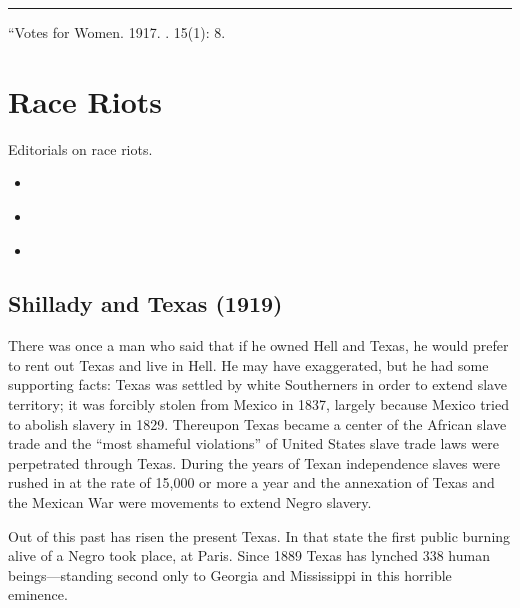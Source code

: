 \documentclass[letterpaper,10pt,english]{jupyterBook}
\begin{document}
\bigskip\hrule\bigskip


\sphinxAtStartPar
{} “Votes for Women. 1917. . 15(1): 8.


\chapter{Race Riots}
\label{\detokenize{Sections/race_riots:race-riots}}\label{\detokenize{Sections/race_riots::doc}}
\sphinxAtStartPar
Editorials on race riots.
\begin{itemize}
\item {} 
\sphinxAtStartPar
{\hyperref[\detokenize{Volumes/18/06/shillady_and_texas::doc}]{}}

\item {} 
\sphinxAtStartPar
{\hyperref[\detokenize{Volumes/34/06/mob_tactics::doc}]{}}

\item {} 
\sphinxAtStartPar
{\hyperref[\detokenize{Volumes/19/03/brothers_come_north::doc}]{}}

\end{itemize}


\section{Shillady and Texas (1919)}
\label{\detokenize{Volumes/18/06/shillady_and_texas:shillady-and-texas-1919}}\label{\detokenize{Volumes/18/06/shillady_and_texas::doc}}
\sphinxAtStartPar
There was once a man who said that if he owned Hell and Texas, he would prefer to rent out Texas and live in Hell. He may have exaggerated, but he had some supporting facts: Texas was settled by white Southerners in order to extend slave territory; it was forcibly stolen from Mexico in 1837, largely because Mexico tried to abolish slavery in 1829. Thereupon Texas became a center of the African slave trade and the “most shameful violations” of United States slave trade laws were perpetrated through Texas. During the years of Texan independence slaves were rushed in at the rate of 15,000 or more a year and the annexation of Texas and the Mexican War were movements to extend Negro slavery.

\sphinxAtStartPar
Out of this past has risen the present Texas. In that state the first public burning alive of a Negro took place, at Paris. Since 1889 Texas has lynched 338 human beings—standing second only to Georgia and Mississippi in this horrible eminence.
\end{document}
